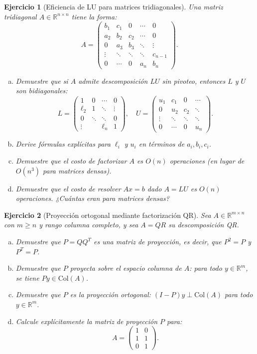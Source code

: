 \documentclass[12pt]{article}
\newtheorem{exercise}{Ejercicio}
\begin{document}
\begin{exercise}[Eficiencia de LU para matrices tridiagonales]
Una matriz tridiagonal $A \in \mathbb{R}^{n \times n}$ tiene la forma:
\[
A = \begin{pmatrix}
b_1 & c_1 & 0 & \cdots & 0 \\
a_2 & b_2 & c_2 & \cdots & 0 \\
0 & a_3 & b_3 & \ddots & \vdots \\
\vdots & \ddots & \ddots & \ddots & c_{n-1} \\
0 & \cdots & 0 & a_n & b_n
\end{pmatrix}.
\]
\begin{enumerate}[(a)]
\item Demuestre que si $A$ admite descomposición $LU$ sin pivoteo, entonces $L$ y $U$ son bidiagonales:
\[
L = \begin{pmatrix}
1 & 0 & \cdots & 0 \\
\ell_2 & 1 & \ddots & \vdots \\
0 & \ddots & \ddots & 0 \\
\vdots & & \ell_n & 1
\end{pmatrix}, \quad
U = \begin{pmatrix}
u_1 & c_1 & 0 & \cdots \\
0 & u_2 & c_2 & \ddots \\
\vdots & \ddots & \ddots & \ddots \\
0 & \cdots & 0 & u_n
\end{pmatrix}.
\]
\item Derive fórmulas explícitas para $\ell_i$ y $u_i$ en términos de $a_i, b_i, c_i$.
\item Demuestre que el costo de factorizar $A$ es $O(n)$ operaciones (en lugar de $O(n^3)$ para matrices densas).
\item Demuestre que el costo de resolver $Ax = b$ dado $A = LU$ es $O(n)$ operaciones. ¿Cuántas eran para matrices densas?
\end{enumerate}
\end{exercise}

\begin{exercise}[Proyección ortogonal mediante factorización QR]
Sea $A \in \mathbb{R}^{m \times n}$ con $m \geq n$ y rango columna completo, y sea $A = QR$ su descomposición QR.
\begin{enumerate}[(a)]
\item Demuestre que $P = QQ^T$ es una matriz de proyección, es decir, que $P^2 = P$ y $P^T = P$.
\item Demuestre que $P$ proyecta sobre el espacio columna de $A$: para todo $y \in \mathbb{R}^m$, se tiene $Py \in \text{Col}(A)$.
\item Demuestre que $P$ es la proyección ortogonal: $(I - P)y \perp \text{Col}(A)$ para todo $y \in \mathbb{R}^m$.
\item Calcule explícitamente la matriz de proyección $P$ para:
\[
A = \begin{pmatrix}
1 & 0 \\
1 & 1 \\
0 & 1
\end{pmatrix}.
\]
\end{enumerate}
\end{exercise}
\end{document}
